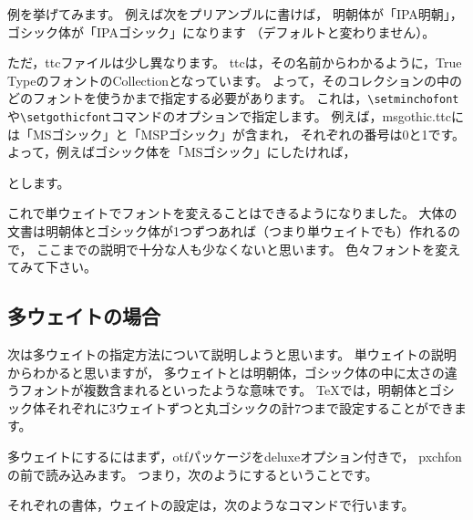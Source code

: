例を挙げてみます。
例えば次をプリアンブルに書けば，
明朝体が「IPA明朝」，ゴシック体が「IPAゴシック」になります
（デフォルトと変わりません）。
\begin{ITeX}
\end{ITeX}

ただ，ttcファイルは少し異なります。
ttcは，その名前からわかるように，True TypeのフォントのCollectionとなっています。
よって，そのコレクションの中のどのフォントを使うかまで指定する必要があります。
これは，\verb|\setminchofont|や\verb|\setgothicfont|コマンドのオプションで指定します。
例えば，msgothic.ttcには「MSゴシック」と「MSPゴシック」が含まれ，
それぞれの番号は0と1です。
よって，例えばゴシック体を「MSゴシック」にしたければ，
\begin{ITeX}
\end{ITeX}
とします。

これで単ウェイトでフォントを変えることはできるようになりました。
大体の文書は明朝体とゴシック体が1つずつあれば（つまり単ウェイトでも）作れるので，
ここまでの説明で十分な人も少なくないと思います。
色々フォントを変えてみて下さい。


\subsection{多ウェイトの場合}
次は多ウェイトの指定方法について説明しようと思います。
単ウェイトの説明からわかると思いますが，
多ウェイトとは明朝体，ゴシック体の中に太さの違うフォントが複数含まれるといったような意味です。
{\TeX}では，明朝体とゴシック体それぞれに3ウェイトずつと丸ゴシックの計7つまで設定することができます。

多ウェイトにするにはまず，otfパッケージをdeluxeオプション付きで，
pxchfonの前で読み込みます。
つまり，次のようにするということです。
\begin{ITeX}
\usepackage[deluxe]{otf}
\usepackage[noalphabet]{pxchfon}
\end{ITeX}

それぞれの書体，ウェイトの設定は，次のようなコマンドで行います。

